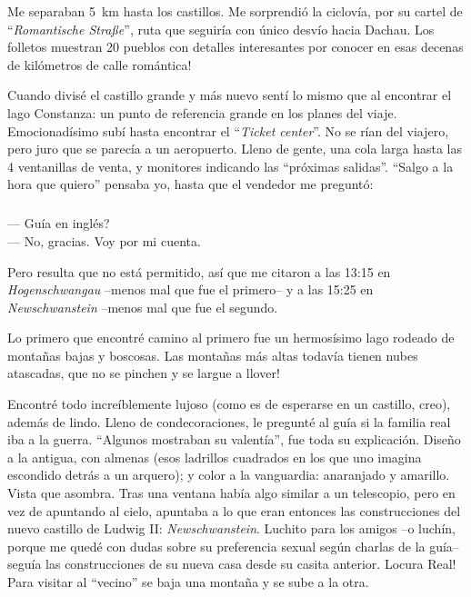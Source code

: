 Me separaban 5~km hasta los castillos. Me sorprendi\'o la ciclov\'ia, por su
cartel de ``\emph{Romantische Stra\ss e}'', ruta que seguir\'ia con \'unico desv\'io
hacia Dachau. \textexclamdown Los folletos muestran 20 pueblos con detalles
interesantes por conocer en esas decenas de kil\'ometros de calle rom\'antica!

Cuando divis\'e el castillo grande y m\'as nuevo sent\'i lo mismo que al
encontrar el lago Constanza: un punto de referencia grande en los planes del
viaje. Emocionad\'isimo sub\'i hasta encontrar el ``\emph{Ticket center}''. No
se r\'ian del viajero, pero juro que se parec\'ia a un aeropuerto. Lleno de
gente, una cola larga hasta las 4 ventanillas de venta, y monitores indicando
las ``pr\'oximas salidas''. ``Salgo a la hora que quiero'' pensaba yo, hasta
que el vendedor me pregunt\'o:

\subparagraph{}\label{ssub:hayGuia} --- \textquestiondown Gu\'ia en
ingl\'es?\\ --- No, gracias. Voy por mi cuenta.\\ \hangindent=1cm

Pero resulta que no est\'a permitido, as\'i que me citaron a las 13:15 en
\emph{Hogenschwangau} --menos mal que fue el primero-- y a las 15:25 en
\emph{Newschwanstein} --menos mal que fue el segundo.

Lo primero que encontr\'e camino al primero fue un hermos\'isimo lago rodeado
de monta\~nas bajas y boscosas. Las monta\~nas m\'as altas todav\'ia tienen
nubes atascadas, \textexclamdown que no se pinchen y se largue a llover!

Encontr\'e todo incre\'iblemente lujoso (como es de esperarse en un castillo,
creo), adem\'as de lindo. Lleno de condecoraciones, le pregunt\'e al gu\'ia si
la familia real iba a la guerra. ``Algunos mostraban su valent\'ia'', fue toda
su explicaci\'on. Dise\~no a la antigua, con almenas (esos ladrillos cuadrados
en los que uno imagina escondido detr\'as a un arquero); y color a la
vanguardia: anaranjado y amarillo. Vista que asombra. Tras una ventana hab\'ia
algo similar a un telescopio, pero en vez de apuntando al cielo, apuntaba a lo
que eran entonces las construcciones del nuevo castillo de Ludwig II:
\emph{Newschwanstein}. Luchito para los amigos --o luch\'in, porque me qued\'e
con dudas sobre su preferencia sexual seg\'un charlas de la gu\'ia-- segu\'ia
las construcciones de su nueva casa desde su casita anterior. \textexclamdown
Locura Real! Para visitar al ``vecino'' se baja una monta\~na y se sube a la
otra.

